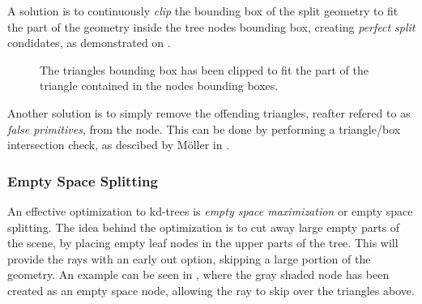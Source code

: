 A solution is to continuously \textit{clip} the bounding box of the
split geometry to fit the part of the geometry inside the tree nodes
bounding box, creating \textit{perfect split} condidates, as
demonstrated on .

\begin{figure}
  \centering
  \caption{The triangles bounding box has been clipped to fit the part
  of the triangle contained in the nodes bounding boxes.}
  \label{fig:aabbContained}
\end{figure}

Another solution is to simply remove the offending triangles, reafter
refered to as \textit{false primitives}, from the node. This can be
done by performing a triangle/box intersection check, as descibed by
Möller in .



\subsubsection{Empty Space Splitting}

An effective optimization to kd-trees is \textit{empty space
  maximization} or empty space splitting. The idea behind the
optimization is to cut away large empty parts of the scene, by placing
empty leaf nodes in the upper parts of the tree. This will provide the
rays with an early out option, skipping a large portion of the
geometry. An example can be seen in ,
where the gray shaded node has been created as an empty space node,
allowing the ray to skip over the triangles above.


